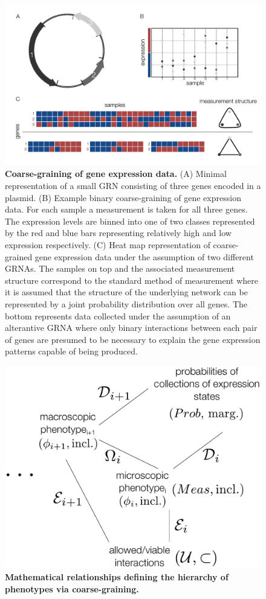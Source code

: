 \begin{figure}[!ht]
\centering
\noindent\includegraphics[width=0.9\columnwidth]{fig/figure_expression_concept.pdf}
\caption{{\bf Coarse-graining of gene expression data.} (A) Minimal representation of a small GRN consisting of three genes encoded in a plasmid. (B) Example binary coarse-graining of gene expression data. For each sample a measurement is taken for all three genes. The expression levels are binned into one of two classes represented by the red and blue bars representing relatively high and low expression respectively. (C) Heat map representation of coarse-grained gene expression data under the assumption of two different GRNAs. The samples on top and the associated measurement structure correspond to the standard method of measurement where it is assumed that the structure of the underlying network can be represented by a joint probability distribution over all genes. The bottom represents data collected under the assumption of an alterantive GRNA where only binary interactions between each pair of genes are presumed to be necessary to explain the gene expression patterns capable of being produced.}
\label{fig:expression_concept}
\end{figure}

\begin{figure}[!ht]
\centering
\noindent\includegraphics[width=0.4\columnwidth]{fig/abstractroadmap.pdf}
\caption{{\bf Mathematical relationships defining the hierarchy of phenotypes via coarse-graining.} }
\label{fig:abstractroadmap}
\end{figure}

